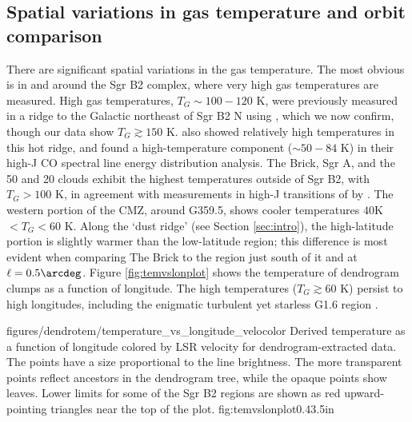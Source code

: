 \subsection{Spatial variations in gas temperature and orbit comparison}
There are significant spatial variations in the gas temperature.  The most
obvious is in and around the Sgr B2 complex, where very high gas temperatures
are measured.  High gas temperatures, $T_G\sim100-120$ K, were previously
measured in a ridge to the Galactic northeast of Sgr B2 N using \methylcyanide
\citep[][Figure 4b]{de-Vicente1997a}, which we now confirm, though our data
show $T_G\gtrsim150$ K.  \citet{Ott2014a} also showed relatively high \ammonia
temperatures in this hot ridge, and \citet{Etxaluze2013a} found a
high-temperature component ($\sim50-84$ K) in their high-J CO spectral line
energy distribution analysis.
The Brick, Sgr A, and the 50 \kms and 20 \kms clouds exhibit the
highest temperatures outside of Sgr B2, with $T_G>100$ K, in agreement with measurements
in high-J transitions of \ammonia by \citet{Mills2013a}.  The western portion of the
CMZ, around G359.5, shows cooler temperatures $40 $K$ < T_G < 60$ K.  
Along the `dust ridge' (see Section \ref{sec:intro}), the high-latitude portion is slightly warmer than the
low-latitude region; this difference is most evident when comparing The Brick
to the region just south of it and at $\ell=0.5\arcdeg$.
Figure \ref{fig:temvslonplot} shows the temperature of dendrogram clumps as a
function of longitude.  The high temperatures ($T_G\gtrsim60$ K) persist to high
longitudes, including the enigmatic turbulent yet starless G1.6 region
\citep{Menten2009a}.



\Figure
{figures/dendrotem/temperature_vs_longitude_velocolor}
{Derived temperature as a function of longitude colored by LSR velocity for
dendrogram-extracted data.  The points have a size proportional to the
\threeohthree line brightness.  The more transparent points reflect ancestors
in the dendrogram tree, while the opaque points show leaves.  Lower limits
for some of the Sgr B2 regions are shown as red upward-pointing triangles near
the top of the plot.}
{fig:temvslonplot}{0.4}{3.5in}

